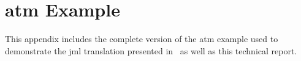 
\chapter{\ac{atm} Example}

This appendix includes the complete version of the \vsl \ac{atm}
example used to demonstrate the \ac{jml} translation presented
in~\cite{Jorgensen&16a} as well as this technical report.



